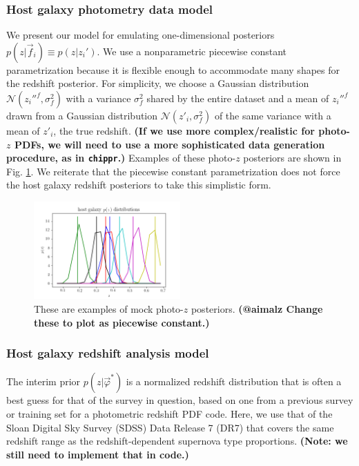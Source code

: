 \documentclass[12pt, onecolumn]{emulateapj}
\begin{document}
\subsubsection{Host galaxy photometry data model}
\label{sec:hostposterior}

We present our model for emulating one-dimensional posteriors $p(z | \vec{f}_{i})\equiv p(z | z_{i}')$.  We use a nonparametric piecewise constant parametrization because it is flexible enough to accommodate many shapes for the redshift posterior.  For simplicity, we choose a Gaussian distribution $\mathcal{N}(z_{i}''^{f}, \sigma_{f}^{2})$ with a variance $\sigma_{f}^{2}$ shared by the entire dataset and a mean of $z_{i}''^{f}$ drawn from a Gaussian distribution $\mathcal{N}(z'_{i}, \sigma_{f}^{2})$ of the same variance with a mean of $z'_{i}$, the true redshift.  \textbf{(If we use more complex/realistic for photo-$z$ PDFs, we will need to use a more sophisticated data generation procedure, as in \texttt{chippr}.)}  Examples of these photo-$z$ posteriors are shown in Fig. \ref{fig:pzs}.  We reiterate that the piecewise constant parametrization does not force the host galaxy redshift posteriors to take this simplistic form.

\begin{figure}
	\begin{center}
		\includegraphics[width=0.5\textwidth]{fig/host_likelihoods.png}
		\caption{These are examples of mock photo-$z$ posteriors.  \textbf{(@aimalz Change these to plot as piecewise constant.)}}
		\label{fig:pzs}
	\end{center}
\end{figure}

\subsubsection{Host galaxy redshift analysis model}
\label{sec:hostinterim}

The interim prior $p(z | \vec{\varphi}^{*})$ is a normalized redshift distribution that is often a best guess for that of the survey in question, based on one from a previous survey or training set for a photometric redshift PDF code.  Here, we use that of the Sloan Digital Sky Survey (SDSS) Data Release 7 (DR7) that covers the same redshift range as the redshift-dependent supernova type proportions.  \textbf{(Note: we still need to implement that in code.)}
\end{document}
